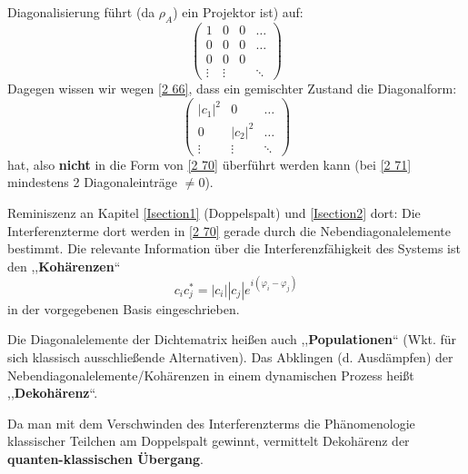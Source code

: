 Diagonalisierung führt (da $ \rho_{A} $) ein Projektor ist) auf:
\begin{equation*}
\begin{pmatrix}
1 & 0 & 0 & \dots \\
0 & 0 & 0 & \dots \\
0 & 0 & 0 \\
\vdots & \vdots & & \ddots
\end{pmatrix}
\end{equation*}
Dagegen wissen wir wegen \eqref{2 66}, dass ein gemischter Zustand die Diagonalform:
\begin{equation}
\begin{pmatrix}
|c_1|^2 & 0  & \dots \\
0 & |c_2|^2  & \dots \\
\vdots & \vdots & \ddots
\end{pmatrix}
\label{2 71}
\end{equation}
hat, also \textbf{nicht} in die Form von \eqref{2 70} überführt werden kann (bei \eqref{2 71} mindestens 2 Diagonaleinträge $ \neq 0 $).\par
Reminiszenz an Kapitel \ref{Isection1} (Doppelspalt) und \ref{Isection2} dort: Die Interferenzterme dort werden in \eqref{2 70} gerade durch die Nebendiagonalelemente bestimmt. Die relevante Information über die Interferenzfähigkeit des Systems ist den ,,\textbf{Kohärenzen}``
\begin{equation*}
c_ic_j^* = |c_i| |c_j| e^{i(\varphi_i - \varphi_j)}
\end{equation*}
in der vorgegebenen Basis eingeschrieben.


\hft


\noindent
Die Diagonalelemente der Dichtematrix heißen auch ,,\textbf{Populationen}`` (Wkt. für sich klassisch ausschließende Alternativen). Das Abklingen (d. Ausdämpfen) der Nebendiagonalelemente/Kohärenzen in einem dynamischen Prozess heißt ,,\textbf{Dekohärenz}``.\par
Da man mit dem Verschwinden des Interferenzterms die Phänomenologie klassischer Teilchen am Doppelspalt gewinnt, vermittelt Dekohärenz der \textbf{quanten-klassischen Übergang}.\\[5pt]
